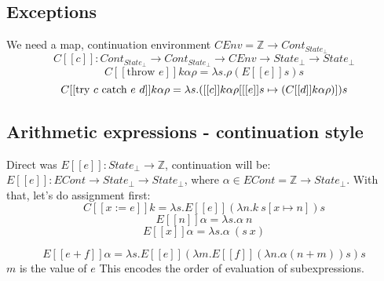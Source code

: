 \documentclass{article}
\begin{document}
\subsection{Exceptions}
We need a map, continuation environment 
$ CEnv=\mathbb{Z} \rightarrow Cont_{State_\bot} $
$$C[[c]]:Cont_{State_\bot} \rightarrow Cont_{State_\bot}  \rightarrow CEnv \rightarrow State_\bot \rightarrow State_\bot$$
$$C[[\text{throw } e]]k\alpha\rho=\lambda s.\rho(E[[e]]s)s$$
$$C[[\text{try $ c $ catch $ e\ d $}]]k\alpha\rho=\lambda s.([[c]]k\alpha\rho[[[e]]s\mapsto(C[[d]]k\alpha\rho)])s$$
\subsection{Arithmetic expressions - continuation style}
Direct was $ E[[e]]:State_\bot \rightarrow \mathbb{Z} $, continuation will be: $ E[[e]] : ECont \rightarrow State_\bot \rightarrow State_\bot$, where $\alpha\in ECont=\mathbb{Z} \rightarrow State_\bot $.
With that, let's do assignment first:
$$C[[x:=e]]k=\lambda s.E[[e]](\lambda n.k\ s[x\mapsto n])s$$
$$ E[[n]]\alpha =\lambda s.\alpha\ n$$
$$ E[[x]]\alpha =\lambda s.\alpha\ (s\ x)$$

$$ E[[e+f]]\alpha =\lambda s.E[[e]](\lambda m.E[[f]](\lambda n.\alpha(n+m))s)s$$
$ m  $ is the value of $ e $
This encodes the order of evaluation of subexpressions.
\end{document}
